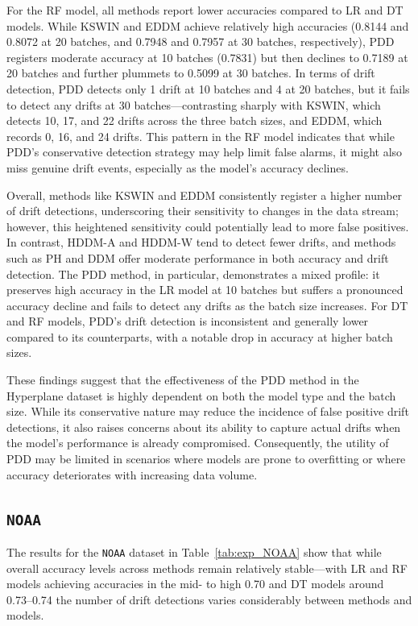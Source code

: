 \documentclass[pdflatex,sn-mathphys-ay]{sn-jnl}%
\theoremstyle{thmstyleone}%
\theoremstyle{thmstyletwo}%
\theoremstyle{thmstylethree}%
\begin{document}
For the RF model, all methods report lower accuracies compared to LR and DT models. While KSWIN and EDDM achieve relatively high accuracies (0.8144 and 0.8072 at 20 batches, and 0.7948 and 0.7957 at 30 batches, respectively), PDD registers moderate accuracy at 10 batches (0.7831) but then declines to 0.7189 at 20 batches and further plummets to 0.5099 at 30 batches. In terms of drift detection, PDD detects only 1 drift at 10 batches and 4 at 20 batches, but it fails to detect any drifts at 30 batches—contrasting sharply with KSWIN, which detects 10, 17, and 22 drifts across the three batch sizes, and EDDM, which records 0, 16, and 24 drifts. This pattern in the RF model indicates that while PDD’s conservative detection strategy may help limit false alarms, it might also miss genuine drift events, especially as the model’s accuracy declines.

Overall, methods like KSWIN and EDDM consistently register a higher number of drift detections, underscoring their sensitivity to changes in the data stream; however, this heightened sensitivity could potentially lead to more false positives. In contrast, HDDM-A and HDDM-W tend to detect fewer drifts, and methods such as PH and DDM offer moderate performance in both accuracy and drift detection. The PDD method, in particular, demonstrates a mixed profile: it preserves high accuracy in the LR model at 10 batches but suffers a pronounced accuracy decline and fails to detect any drifts as the batch size increases. For DT and RF models, PDD’s drift detection is inconsistent and generally lower compared to its counterparts, with a notable drop in accuracy at higher batch sizes.

These findings suggest that the effectiveness of the PDD method in the Hyperplane dataset is highly dependent on both the model type and the batch size. While its conservative nature may reduce the incidence of false positive drift detections, it also raises concerns about its ability to capture actual drifts when the model’s performance is already compromised. Consequently, the utility of PDD may be limited in scenarios where models are prone to overfitting or where accuracy deteriorates with increasing data volume.

\subsection*{\texttt{NOAA}}

The results for the \texttt{NOAA} dataset in Table~\ref{tab:exp_NOAA} show that while overall accuracy levels across methods remain relatively stable—with LR and RF models achieving accuracies in the mid- to high 0.70 and DT models around 0.73–0.74 the number of drift detections varies considerably between methods and models.
\end{document}
